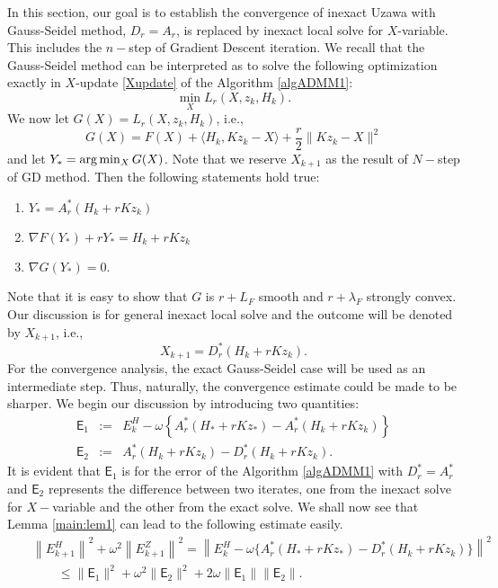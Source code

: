In this section, our goal is to establish the convergence of inexact Uzawa with Gauss-Seidel method, $D_r = A_r$, is replaced by inexact local solve for $X$-variable. This includes the $n-$step of Gradient Descent iteration. We recall that the Gauss-Seidel method can be interpreted as to solve the following optimization exactly in $X$-update \eqref{Xupdate} of the Algorithm \ref{algADMM1}:  
\begin{equation}
\min_{X} L_r(X,z_k,H_k).  
\end{equation}
We now let $G(X) = L_r(X,z_k,H_k)$, i.e.,  
\begin{equation}
G(X) = F(X) + \langle H_k, Kz_k - X\rangle + \frac{r}{2}\|Kz_k - X\|^2 
\end{equation}
and let $Y_*  = {\rm arg}\min_X G(X)$. Note that we reserve $X_{k+1}$ as the result of $N-$step of GD method. Then the following statements hold true: 
\begin{enumerate} 
\item $Y_* = A_r^*(H_k + rKz_k)$ 
\item $\nabla F(Y_*) + r Y_* = H_k + rKz_k$ 
\item $\nabla G(Y_*) = 0$. 
\end{enumerate} 
Note that it is easy to show that $G$ is $r+L_F$ smooth and $r+\lambda_F$ strongly convex. Our discussion is for general inexact local solve and the outcome will be denoted by $X_{k+1}$, i.e., 
\begin{equation}
X_{k+1} = D_r^*(H_k + rKz_k). 
\end{equation}
For the convergence analysis, the exact Gauss-Seidel case will be used as an intermediate step. Thus, naturally, the convergence estimate could be made to be sharper. We begin our discussion by introducing two quantities:
\begin{eqnarray*}
\textsf{E}_1 &:=& E_k^H - \omega \left \{A_r^{*}(H_* + rKz_*) - A_r^*(H_k + rKz_k) \right \}\\
\textsf{E}_2 &:=& A_r^*(H_k + rKz_k) - D_r^*(H_k + rKz_k).  
\end{eqnarray*}
It is evident that $\textsf{E}_1$ is for the error of the Algorithm \ref{algADMM1} with $D_r^* = A_r^*$ and $\textsf{E}_2$ represents the difference between two iterates, one from the inexact solve for $X-$variable and the other from the exact solve. We shall now see that Lemma \ref{main:lem1} can lead to the following estimate easily. 
\begin{eqnarray*}
&& \left \|E_{k+1}^H \right \|^2 + \omega^2 \left \|E_{k+1}^Z \right \|^2 = \left \|E_k^H - \omega \{ A_r^{*} (H_* + r K z_*) - D_r^{*} (H_k + r K z_k) \} \right \|^2 \\
&& \qquad \leq \|\textsf{E}_1\|^2 + \omega^2 \|\textsf{E}_2\|^2 + 2 \omega \|\textsf{E}_1\| \|\textsf{E}_2\|. 
\end{eqnarray*}
